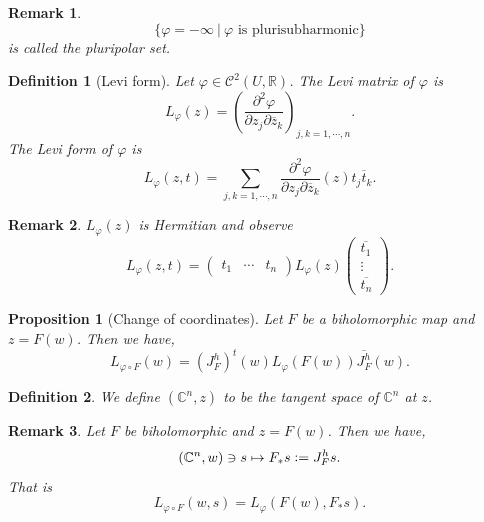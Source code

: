 \documentclass{article}
\newtheorem{proposition}{Proposition}[section]
\newtheorem{definition}{Definition}[section]
\newtheorem{remark}{Remark}[section]
\newcommand{\defeq}{\vcentcolon=}
\newcommand{\R}[0]{\mathbb{R}}
\newcommand{\C}[0]{\mathbb{C}}
\newcommand{\sep}[0]{\:|\:}
\begin{document}
\begin{remark}
  \begin{equation*}
    \{\varphi=-\infty\sep \varphi\text{ is plurisubharmonic}\}
  \end{equation*}
  is called the pluripolar set.
\end{remark}

\begin{definition}[Levi form]
  Let $\varphi\in\mathcal{C}^2(U,\R)$. The Levi matrix of $\varphi$ is 
  \begin{equation*}
    L_\varphi(z) = \left({\frac {\partial^2\varphi} {\partial z_j\partial\overline{z}_k}}\right)_{j,k=1,\cdots,n}.
  \end{equation*}
  The Levi form of $\varphi$ is 
  \begin{equation*}
    L_\varphi(z,t) = \sum_{j,k=1,\cdots,n}{\frac {\partial^2\varphi} {\partial z_j\partial \overline{z}_k}}(z)t_j\overline{t}_k.
  \end{equation*}
\end{definition}

\begin{remark}
  $L_\varphi(z)$ is Hermitian and observe 
  \begin{equation*}
    L_\varphi(z,t) = \begin{pmatrix}
      t_1 & \cdots & t_n
    \end{pmatrix}
    L_\varphi(z)
    \begin{pmatrix}
      \overline{t_1}\\\vdots\\ \overline{t_n}
    \end{pmatrix}.
  \end{equation*}
\end{remark}

\begin{proposition}[Change of coordinates]
  Let $F$ be a biholomorphic map and $z=F(w)$. Then we have,
  \begin{equation*}
    L_{\varphi\circ F}(w) = (J^h_F)^t(w)L_\varphi(F(w))\overline{J_F^h}(w).
  \end{equation*}
\end{proposition}

\begin{definition}
  We define $(\C^n,z)$ to be the tangent space of $\C^n$ at $z$. 
\end{definition}

\begin{remark}
  Let $F$ be biholomorphic and $z = F(w)$. Then we have,
  \begin{equation*}
    (\C^n,w)\ni s\mapsto F_*s\defeq J_F^hs.
  \end{equation*}
  That is 
  \begin{equation*}
    L_{\varphi\circ F}(w,s) = L_\varphi(F(w),F_*s).
  \end{equation*}
\end{remark}
\end{document}
